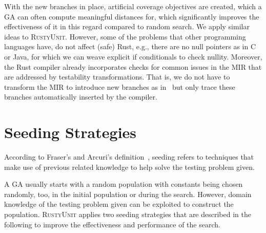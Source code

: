 \documentclass[paper=a4,%
  twoside,%
  BCOR4mm,%
  abstract=true,%
  toc=bibliography,%
  chapterprefix=true,%
  toc=bibliographynumbered,%
  open=right,%
  english,%
  pagesize=pdftex]{scrreprt}
\newcommand{\tech}{\textsc{RustyUnit}\xspace}
\newcommand{\mir}{\ac{MIR}\xspace}
\newcommand{\ga}{\ac{GA}\xspace}
\begin{document}
With the new branches in place, artificial coverage objectives are created, which a \ga can often compute meaningful distances for, which significantly improves the effectiveness of it in this regard compared to random search. We apply similar ideas to \tech. However, some of the problems that other programming languages have, do not affect (safe) Rust, e.g., there are no null pointers as in C or Java, for which we can weave explicit if conditionals to check nullity. Moreover, the Rust compiler already incorporates checks for common issues in the \mir that are addressed by testability transformations. That is, we do not have to transform the \mir to introduce new branches as in~ but only trace these branches automatically inserted by the compiler.

\section{Seeding Strategies}
\label{sec:seeding-strategies}
According to Fraser's and Arcuri's definition~\cite{6200103}, seeding refers to techniques that make use of previous related knowledge to help solve the testing problem given.

A \ga usually starts with a random population with constants being chosen randomly, too, in the initial population or during the search. However, domain knowledge of the testing problem given can be exploited to construct the population. \tech applies two seeding strategies that are described in the following to improve the effectiveness and performance of the search.
\end{document}
